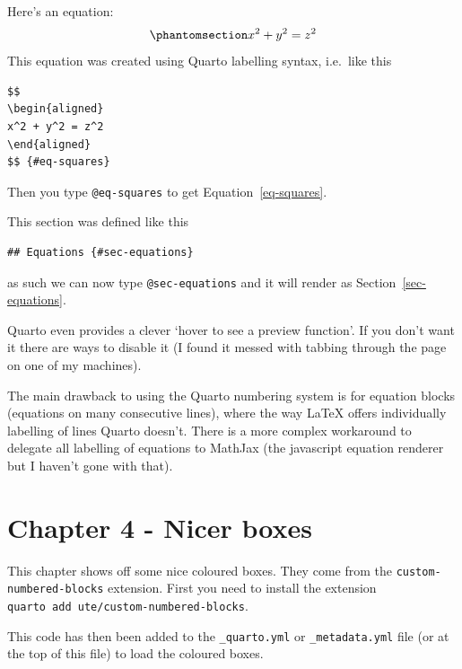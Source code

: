 \documentclass[
  a4paper,
  DIV=11,
  numbers=noendperiod,
  oneside]{scrreport}
\begin{document}
Here's an equation: \begin{equation}\phantomsection\label{eq-squares}{
\begin{aligned}
x^2 + y^2 = z^2
\end{aligned}
}\end{equation} This equation was created using Quarto labelling syntax,
i.e.~like this

\begin{verbatim}
$$
\begin{aligned}
x^2 + y^2 = z^2
\end{aligned}
$$ {#eq-squares}
\end{verbatim}

Then you type \texttt{@eq-squares} to get Equation~\ref{eq-squares}.

This section was defined like this

\begin{verbatim}
## Equations {#sec-equations}
\end{verbatim}

as such we can now type \texttt{@sec-equations} and it will render as
Section~\ref{sec-equations}.

Quarto even provides a clever `hover to see a preview function'. If you
don't want it there are ways to disable it (I found it messed with
tabbing through the page on one of my machines).

The main drawback to using the Quarto numbering system is for equation
blocks (equations on many consecutive lines), where the way LaTeX offers
individually labelling of lines Quarto doesn't. There is a more complex
workaround to delegate all labelling of equations to MathJax (the
javascript equation renderer but I haven't gone with that).


\chapter{Chapter 4 - Nicer boxes}\label{chapter-4---nicer-boxes}

This chapter shows off some nice coloured boxes. They come from the
\texttt{custom-numbered-blocks} extension. First you need to install the
extension \texttt{quarto\ add\ ute/custom-numbered-blocks}.

This code has then been added to the \texttt{\_quarto.yml} or
\texttt{\_metadata.yml} file (or at the top of this file) to load the
coloured boxes.
\end{document}
